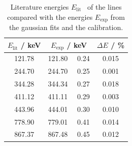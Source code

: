 \begin{table}[H]
	\centering
	\caption{Literature energies $E_\text{lit}$~\cite{eu152} of the  lines compared with the energies $E_\text{exp}$ from the gaussian fits and the calibration.}
	\label{tab:disc_eu}
	\begin{tabular}{c  c  c}
		\toprule
		$E_\text{lit}$ / keV & $E_\text{exp}$ / keV & $\Delta E$ / \%\\
		\midrule
		121.78 & 121.80  \, \clap{$\pm$} \,  0.24 & 0.015 \\
		 244.70 & 244.70  \, \clap{$\pm$} \,  0.25 & 0.001 \\
		 344.28 & 344.34  \, \clap{$\pm$} \,  0.27 & 0.018 \\
		 411.12 & 411.11  \, \clap{$\pm$} \,  0.29 & 0.003 \\
		 443.96 & 444.01  \, \clap{$\pm$} \,  0.30 & 0.010 \\
		 778.90 & 779.01  \, \clap{$\pm$} \,  0.41 & 0.014 \\
		 867.37 & 867.48  \, \clap{$\pm$} \,  0.45 & 0.012 \\
		 \bottomrule
	\end{tabular}
\end{table}
